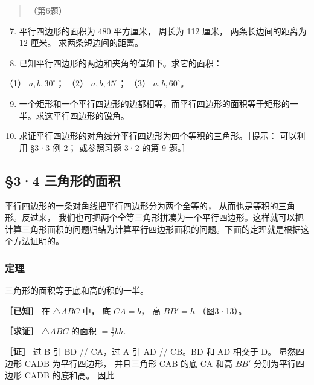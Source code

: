 \begin{quote}
（第6题）
\end{quote}

\begin{enumerate}
\setcounter{enumi}{6}
\item
  平行四边形的面积为 480 平方厘米， 周长为 112 厘米， 两条长边间的距离为
  12 厘米。 求两条短边间的距离。
\item
  已知平行四边形的两边和夹角的值如下。求它的面积：
\end{enumerate}

（1） \(a, b, 30^{\circ}\)； （2） \(a, b, 45^{\circ}\)； （3）
\(a, b, 60^{\circ}\)。

\begin{enumerate}
\setcounter{enumi}{8}
\item
  一个矩形和一个平行四边形的边都相等，而平行四边形的面积等于矩形的一半。求这平行四边形的锐角。
\item
  求证平行四边形的对角线分平行四边形为四个等积的三角形。［提示：
  可以利用 §3·3 例 2； 或参照习题 3·2 的第 9 题。］
\end{enumerate}

\subsection{§3·4
三角形的面积}

平行四边形的一条对角线把平行四边形分为两个全等的，
从而也是等积的三角形。反过来，
我们也可把两个全等三角形拼凑为一个平行四边形。这样就可以把计算三角形面积的问题归结为计算平行四边形面积的问题。下面的定理就是根据这个方法证明的。

\subsubsection{定理}

三角形的面积等于底和高的积的一半。

\textbf{［已知］} 在 \(\triangle ABC\) 中， 底 \(CA = b\)， 高
\(BB' = h\) （图3·13）。

\textbf{［求证］} \(\triangle ABC\) 的面积 \(= \frac{1}{2} bh.\)

\textbf{［证］} 过 B 引 BD // CA，过 A 引 AD // CB。BD 和 AD 相交于 D。
显然四边形 CADB 为平行四边形， 并且三角形 CAB 的底 CA 和高 \(BB'\)
分别为平行四边形 CADB 的底和高。 因此


